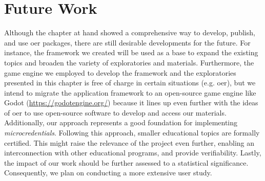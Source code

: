 \section{Future Work}
Although the chapter at hand showed a comprehensive way to develop, publish, and use \acrshort{oer} packages, there are still desirable developments for the future. For instance, the framework we created will be used as a base to expand the existing topics and broaden the variety of exploratories and materials. Furthermore, the game engine we employed to develop the framework and the exploratories presented in this chapter is free of charge in certain situations (e.g. \acrshort{oer}), but we intend to migrate the application framework to an open-source game engine like Godot (\url{https://godotengine.org/}) because it lines up even further with the ideas of \acrshort{oer} to use open-source software to develop and access our materials. Additionally, our approach represents a good foundation for implementing \emph{microcredentials}. Following this approach, smaller educational topics are formally certified. This might raise the relevance of the project even further, enabling an interconnection with other educational programs, and provide verifiability. Lastly, the impact of our work should be further assessed to a statistical significance. Consequently, we plan on conducting a more extensive user study.